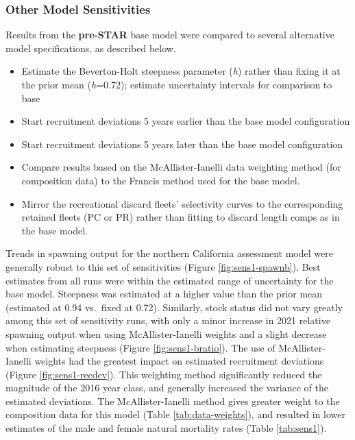 \documentclass[
  english,
  a4paper,
]{article}
\providecommand{\tightlist}{%
  \setlength{\itemsep}{0pt}\setlength{\parskip}{0pt}}
\begin{document}
\hypertarget{other-model-sensitivities}{%
\subsubsection{Other Model Sensitivities}\label{other-model-sensitivities}}

Results from the \textbf{pre-STAR} base model were compared to several alternative model specifications, as described below.

\begin{itemize}
\tightlist
\item
  Estimate the Beverton-Holt steepness parameter (\emph{h}) rather than fixing it at the prior mean (\emph{h}=0.72); estimate uncertainty intervals for comparison to base
\item
  Start recruitment deviations 5 years earlier than the base model configuration
\item
  Start recruitment deviations 5 years later than the base model configuration
\item
  Compare results based on the McAllister-Ianelli data weighting method (for composition data) to the Francis method used for the base model.
\item
  Mirror the recreational discard fleets' selectivity curves to the corresponding retained fleets (PC or PR) rather than fitting to discard length comps as in the base model.
\end{itemize}

Trends in spawning output for the northern California assessment model were generally robust to this set of sensitivities (Figure \ref{fig:sens1-spawnb}). Best estimates from all runs were within the estimated range of uncertainty for the base model. Steepness was estimated at a higher value than the prior mean (estimated at 0.94 vs.~fixed at 0.72). Similarly, stock status did not vary greatly among this set of sensitivity runs, with only a minor increase in 2021 relative spawning output when using McAllister-Ianelli weights and a slight decrease when estimating steepness (Figure \ref{fig:sens1-bratio}). The use of McAllister-Ianelli weights had the greatest impact on estimated recruitment deviations (Figure \ref{fig:sens1-recdev}). This weighting method significantly reduced the magnitude of the 2016 year class, and generally increased the variance of the estimated deviations. The McAllister-Ianelli method gives greater weight to the composition data for this model (Table \ref{tab:data-weights}), and resulted in lower estimates of the male and female natural mortality rates (Table \ref{tab:sens1}).
\end{document}
